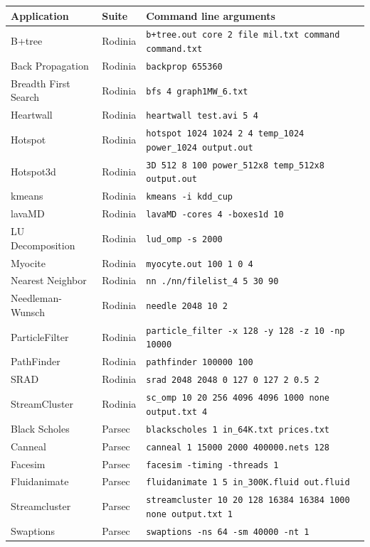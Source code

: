\documentclass[12pt,twoside]{reedthesis}
\begin{document}
			\begin{tabular}{ |l|l|l| }
				\hline
				Application          & Suite   & Command line arguments  \\ \hline
				\hline
				B+tree & Rodinia  &  \texttt{b+tree.out core 2 file mil.txt command command.txt}  \\ \hline
				Back Propagation & Rodinia  &  \texttt{backprop 655360} \\ \hline
				Breadth First Search & Rodinia  &  \texttt{bfs 4 graph1MW\_6.txt}  \\ \hline
				Heartwall & Rodinia  & \texttt{heartwall test.avi 5 4} \\ \hline
				Hotspot & Rodinia  &   \texttt{hotspot 1024 1024 2 4 temp\_1024 power\_1024 output.out} \\ \hline
				Hotspot3d & Rodinia  & \texttt{3D 512 8 100 power\_512x8 temp\_512x8 output.out}   \\ \hline
				kmeans & Rodinia  &    \texttt{kmeans -i kdd\_cup} \\ \hline
				lavaMD & Rodinia  &  \texttt{lavaMD -cores 4 -boxes1d 10}   \\ \hline
				LU Decomposition & Rodinia    &  \texttt{lud\_omp -s 2000} \\ \hline
				Myocite & Rodinia  &  \texttt{myocyte.out 100 1 0 4}  \\ \hline
				Nearest Neighbor & Rodinia  &  \texttt{nn ./nn/filelist\_4 5 30 90}   \\ \hline
				Needleman-Wunsch & Rodinia  & \texttt{needle 2048 10 2}    \\ \hline
				ParticleFilter & Rodinia  &    \texttt{particle\_filter -x 128 -y 128 -z 10 -np 10000} \\ \hline
				PathFinder & Rodinia  &  \texttt{pathfinder 100000 100}   \\ \hline
				SRAD & Rodinia  &  \texttt{srad 2048 2048 0 127 0 127 2 0.5 2}   \\ \hline
				StreamCluster & Rodinia  &    \texttt{sc\_omp 10 20 256 4096 4096 1000 none output.txt 4} \\ \hline
				Black Scholes & Parsec  &  \texttt{blackscholes 1 in\_64K.txt prices.txt} \\ \hline
				Canneal & Parsec  &  \texttt{canneal 1 15000 2000 400000.nets 128} \\ \hline
				Facesim & Parsec  &  \texttt{facesim -timing -threads 1} \\ \hline
				Fluidanimate & Parsec  &  \texttt{fluidanimate 1 5 in\_300K.fluid out.fluid} \\ \hline
				Streamcluster & Parsec  &  \texttt{streamcluster 10 20 128 16384 16384 1000 none output.txt 1} \\ \hline
				Swaptions & Parsec  &  \texttt{swaptions -ns 64 -sm 40000 -nt 1} \\ \hline
			\end{tabular}
		
\end{document}
